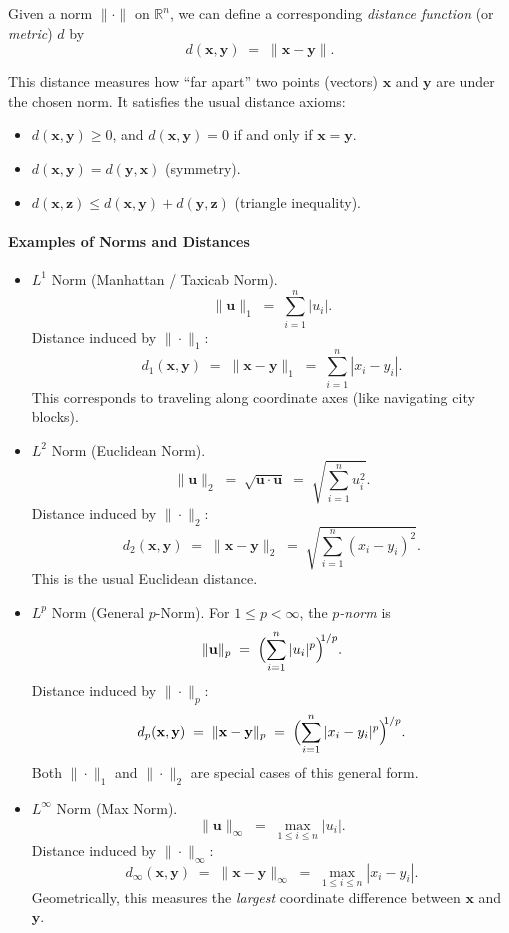 \noindent
Given a norm $\|\cdot\|$ on $\mathbb{R}^n$, we can define a corresponding 
\emph{distance function} (or \emph{metric}) $d$ by
\[
d(\mathbf{x}, \mathbf{y}) \;=\; \|\mathbf{x} - \mathbf{y}\|.
\]

This distance measures how ``far apart'' two points (vectors) $\mathbf{x}$ and $\mathbf{y}$ 
are under the chosen norm. It satisfies the usual distance axioms:

\begin{itemize}
\item $d(\mathbf{x}, \mathbf{y}) \ge 0$, and $d(\mathbf{x}, \mathbf{y}) = 0$ if and only if $\mathbf{x} = \mathbf{y}$.
\item $d(\mathbf{x}, \mathbf{y}) = d(\mathbf{y}, \mathbf{x})$ (symmetry).
\item $d(\mathbf{x}, \mathbf{z}) \le d(\mathbf{x}, \mathbf{y}) + d(\mathbf{y}, \mathbf{z})$ (triangle inequality).
\end{itemize}

\paragraph{Examples of Norms and Distances}

\begin{itemize}
\item{\boldmath $L^1$ Norm (Manhattan / Taxicab Norm).}
\[
\|\mathbf{u}\|_1 \;=\; \sum_{i=1}^n |u_i|.
\]
Distance induced by \(\|\cdot\|_1\):
\[
d_1(\mathbf{x}, \mathbf{y}) 
\;=\; \|\mathbf{x} - \mathbf{y}\|_1 
\;=\; \sum_{i=1}^n |x_i - y_i|.
\]
This corresponds to traveling along coordinate axes (like navigating city blocks).

\item{\boldmath $L^2$ Norm (Euclidean Norm).}
\[
\|\mathbf{u}\|_2 \;=\; \sqrt{\mathbf{u} \cdot \mathbf{u}} 
\;=\; \sqrt{\sum_{i=1}^n u_i^2}.
\]
Distance induced by \(\|\cdot\|_2\):
\[
d_2(\mathbf{x}, \mathbf{y}) 
\;=\; \|\mathbf{x} - \mathbf{y}\|_2 
\;=\; \sqrt{\sum_{i=1}^n (x_i - y_i)^2}.
\]
This is the usual Euclidean distance.

\item{\boldmath $L^p$ Norm (General $p$-Norm).}
For $1 \le p < \infty$, the \emph{$p$-norm} is
\[
\|\mathbf{u}\|_p 
\;=\; 
\Bigl(\sum_{i=1}^n |u_i|^p \Bigr)^{\!\!1/p}.
\]
Distance induced by \(\|\cdot\|_p\):
\[
d_p(\mathbf{x}, \mathbf{y}) 
\;=\; \|\mathbf{x} - \mathbf{y}\|_p 
\;=\; 
\Bigl(\sum_{i=1}^n |x_i - y_i|^p \Bigr)^{\!\!1/p}.
\]
Both $\|\cdot\|_1$ and $\|\cdot\|_2$ are special cases of this general form.

\item{\boldmath $L^\infty$ Norm (Max Norm).}
\[
\|\mathbf{u}\|_\infty 
\;=\; \max_{1 \le i \le n} |u_i|.
\]
Distance induced by \(\|\cdot\|_\infty\):
\[
d_\infty(\mathbf{x}, \mathbf{y}) 
\;=\; \|\mathbf{x} - \mathbf{y}\|_\infty 
\;=\; \max_{1 \le i \le n} |x_i - y_i|.
\]
Geometrically, this measures the \emph{largest} coordinate difference between $\mathbf{x}$ and $\mathbf{y}$.

\end{itemize}





